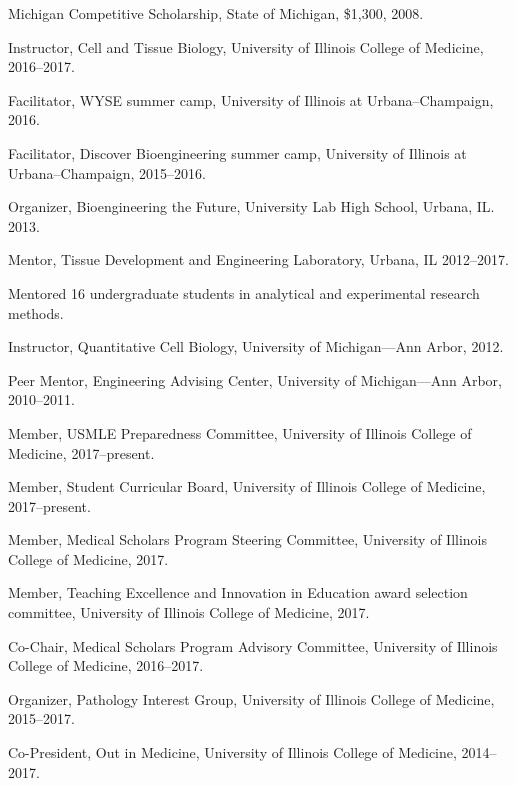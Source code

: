 \documentclass[11pt,article,oneside]{memoir}
\begin{document}
\ind Michigan Competitive Scholarship, State of Michigan, \$1,300, 2008.

\bigskip\bigskip


\ind Instructor, Cell and Tissue Biology, University of Illinois College of Medicine, 2016--2017.

\ind Facilitator, WYSE summer camp, University of Illinois at Urbana--Champaign, 2016.

\ind Facilitator, Discover Bioengineering summer camp, University of Illinois at Urbana--Champaign, 2015--2016.

\ind Organizer, Bioengineering the Future, University Lab High School, Urbana, IL. 2013.

\ind Mentor, Tissue Development and Engineering Laboratory, Urbana, IL 2012--2017.

\ind \hspace{0.35in} \footnotesize Mentored 16 undergraduate students in analytical and experimental research methods. \normalsize\vspace{0.05in}

\ind Instructor, Quantitative Cell Biology, University of Michigan---Ann Arbor, 2012.

\ind Peer Mentor, Engineering Advising Center, University of Michigan---Ann Arbor, 2010--2011.

\bigskip


\ind Member, USMLE Preparedness Committee, University of Illinois College of Medicine, 2017--present.

\ind Member, Student Curricular Board, University of Illinois College of Medicine, 2017--present.

\ind Member, Medical Scholars Program Steering Committee, University of Illinois College of Medicine, 2017.

\ind Member, Teaching Excellence and Innovation in Education award selection committee, University of Illinois College of Medicine, 2017.

\ind Co-Chair, Medical Scholars Program Advisory Committee, University of Illinois College of Medicine, 2016--2017.

\ind Organizer, Pathology Interest Group, University of Illinois College of Medicine, 2015--2017.

\ind Co-President, Out in Medicine, University of Illinois College of Medicine, 2014--2017.
\end{document}
